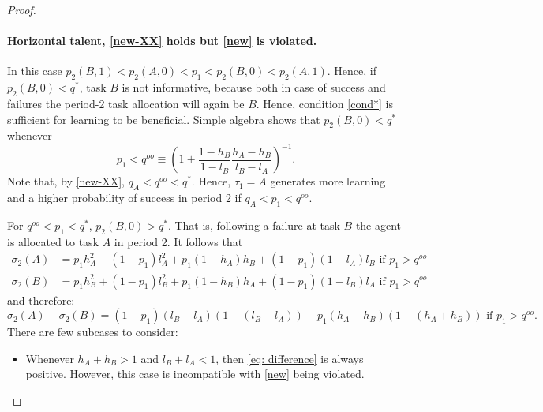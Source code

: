 \documentclass[12pt,american]{paper}
\theoremstyle{remark}
\begin{document}
\begin{proof}
\paragraph{Horizontal talent, \eqref{new-XX} holds but \eqref{new} is violated.} In this case $p_2(B,1)<p_2(A,0)<p_1<p_2(B,0)<p_2(A,1)$. Hence, if $p_2(B,0)<q^*$, task $B$ is not informative, because both in case of success and failures the period-2 task allocation will again be $B$.  Hence, condition \eqref{cond*} is sufficient for learning to be beneficial.  Simple algebra shows that $p_2(B,0)<q^*$ whenever
$$p_1<q^{oo}\equiv\left(1+\frac{1-h_B}{1-l_B}\frac{h_A-h_B}{l_B-l_A}\right)^{-1}.$$
Note that, by \ref{new-XX}, $q_A<q^{oo}<q^*$. Hence, $\tau_1=A$ generates more learning and a higher probability of success in period 2 if $q_A<p_1<q^{oo}$.

For $q^{oo}<p_1<q^*$, $p_2(B,0)>q^*$. That is, following a failure at task $B$ the agent is allocated to task $A$ in period 2. It follows that
\begin{align*}
\sigma_2(A) %
&=p_1 h_A^2 +(1-p_1) l_A^2 +p_1(1-h_A)h_B+(1-p_1)(1-l_A)l_B \mbox{  if }p_1>q^{oo}\\
\sigma_2(B) %
&=p_1 h_B^2 +(1-p_1) l_B^2 +p_1(1-h_B)h_A+(1-p_1)(1-l_B)l_A \mbox{  if }p_1>q^{oo}
\end{align*}
 and therefore:
\begin{equation}\label{eq: difference}
\sigma_2(A)-\sigma_2(B)=(1-p_1)(l_B-l_A)(1- (l_B+l_A))-p_1(h_A-h_B)(1-(h_A+h_B)) \mbox{  if }p_1>q^{oo}.
\end{equation}
There are few subcases to consider:
\begin{itemize}
\item Whenever $h_A+h_B>1$ and $l_B+l_A<1$, then \ref{eq: difference} is always positive. However, this case is incompatible with \eqref{new} being violated.


\end{itemize}
\end{proof}
\end{document}
